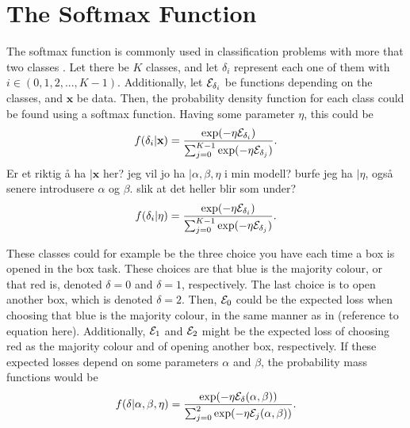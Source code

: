 \section{The Softmax Function} \label{section_theory_softmax}
The softmax function is commonly used in classification problems with more that two classes \citep{softmax}. Let there be $K$ classes, and let $\delta_i$ represent each one of them with $i \in (0,1,2,...,K-1)$. Additionally, let $\mathcal{E}_{\delta_i}$ be functions depending on the classes, and $\textbf{x}$ be data. Then, the probability density function for each class could be found using a softmax function. Having some parameter $\eta$, this could be
\begin{equation*}
    \begin{aligned}
        f(\delta_i|\textbf{x}) = \frac{\text{exp}(- \eta \mathcal{E}_{\delta_i})}{\sum_{j=0}^{K-1} \text{exp}(-\eta \mathcal{E}_{\delta_j})}.
    \end{aligned}
\end{equation*}
Er et riktig å ha $|\textbf{x}$ her? jeg vil jo ha $|\alpha,\beta,\eta$ i min modell? burfe jeg ha $|\eta$, også senere introdusere $\alpha$ og $\beta$. slik at det heller blir som under?
\begin{equation*}
    \begin{aligned}
        f(\delta_i|\eta) = \frac{\text{exp}(- \eta \mathcal{E}_{\delta_i})}{\sum_{j=0}^{K-1} \text{exp}(-\eta \mathcal{E}_{\delta_j})}.
    \end{aligned}
\end{equation*}

These classes could for example be the three choice you have each time a box is opened in the box task. These choices are that blue is the majority colour, or that red is, denoted $\delta=0$ and $\delta=1$, respectively. The last choice is to open another box, which is denoted $\delta=2$. Then, $\mathcal{E}_0$ could be the expected loss when choosing that blue is the majority colour, in the same manner as in (reference to equation here). Additionally, $\mathcal{E}_1$ and $\mathcal{E}_2$ might be the expected loss of choosing red as the majority colour and of opening another box, respectively. If these expected losses depend on some parameters $\alpha$ and $\beta$, the probability mass functions would be
\begin{equation}
\label{softmax_1}
    f(\delta|\alpha,\beta,\eta) = \frac{\text{exp}(- \eta \mathcal{E}_{\delta}(\alpha,\beta))}{\sum_{j=0}^{2} \text{exp}(-\eta \mathcal{E}_{j}(\alpha,\beta))}.
\end{equation}


